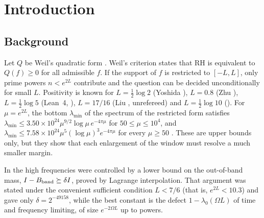 \documentclass[11pt]{amsart}
\theoremstyle{remark}
\numberwithin{equation}{section}
\begin{document}
\begin{center}
\end{center}

\section{Introduction}

\subsection{Background}
Let $Q$ be Weil's quadratic form \cite{Weil1952,Bombieri2000}. Weil's criterion states that RH is equivalent to $Q(f)\ge0$ for all admissible $f$. If the support of $f$ is restricted to $[-L,L]$, only prime powers $n<e^{2L}$ contribute and the question can be decided unconditionally for small $L$. Positivity is known for $L=\frac12\log2$ (Yoshida \cite{Yoshida1992}), $L=0.8$ (Zhu \cite{Zhu2026}), $L=\frac12\log5$ (Lean~4, \cite{MoriLog5}), $L=17/16$ (Liu \cite{Liu2026}, unrefereed) and $L=\frac12\log10$ (\cite{MoriVI}). For $\mu=e^{2L}$, the bottom $\lambda_{\min}$ of the spectrum of the restricted form satisfies $\lambda_{\min}\le3.50\times10^{24}\mu^{9/2}\log\mu\,e^{-4\pi\mu}$ for $50\le\mu\le10^4$, and $\lambda_{\min}\le7.58\times10^{24}\mu^5(\log\mu)^3e^{-4\pi\mu}$ for every $\mu\ge50$ \cite[Theorem~K]{MoriWeilV}. These are upper bounds only, but they show that each enlargement of the window must resolve a much smaller margin.

In \cite{MoriVI} the high frequencies were controlled by a lower bound on the out-of-band mass, $I-B_{\rm band}\succeq\delta I$, proved by Lagrange interpolation. That argument was stated under the convenient sufficient condition $L<7/6$ (that is, $e^{2L}<10.3$) and gave only $\delta=2^{-49158}$, while the best constant is the defect $1-\lambda_0(\Omega L)$ of time and frequency limiting, of size $e^{-2\Omega L}$ up to powers.
\end{document}
